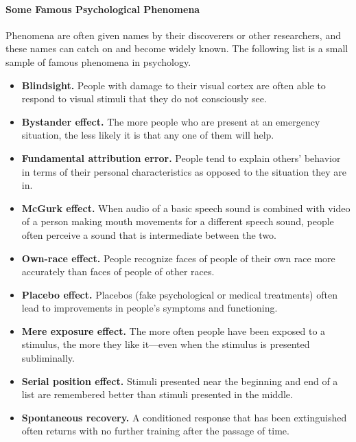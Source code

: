 \documentclass[
]{krantz}
\providecommand{\tightlist}{%
  \setlength{\itemsep}{0pt}\setlength{\parskip}{0pt}}
\begin{document}
\paragraph*{Some Famous Psychological Phenomena}\label{some-famous-psychological-phenomena}

Phenomena are often given names by their discoverers or other researchers, and these names can catch on and become widely known. The following list is a small sample of famous phenomena in psychology.

\begin{itemize}
\tightlist
\item
  \textbf{Blindsight.} People with damage to their visual cortex are often able to respond to visual stimuli that they do not consciously see.
\item
  \textbf{Bystander effect.} The more people who are present at an emergency situation, the less likely it is that any one of them will help.
\item
  \textbf{Fundamental attribution error.} People tend to explain others' behavior in terms of their personal characteristics as opposed to the situation they are in.
\item
  \textbf{McGurk effect.} When audio of a basic speech sound is combined with video of a person making mouth movements for a different speech sound, people often perceive a sound that is intermediate between the two.
\item
  \textbf{Own-race effect.} People recognize faces of people of their own race more accurately than faces of people of other races.
\item
  \textbf{Placebo effect.} Placebos (fake psychological or medical treatments) often lead to improvements in people's symptoms and functioning.
\item
  \textbf{Mere exposure effect.} The more often people have been exposed to a stimulus, the more they like it---even when the stimulus is presented subliminally.
\item
  \textbf{Serial position effect.} Stimuli presented near the beginning and end of a list are remembered better than stimuli presented in the middle.
\item
  \textbf{Spontaneous recovery.} A conditioned response that has been extinguished often returns with no further training after the passage of time.
\end{itemize}
\end{document}
